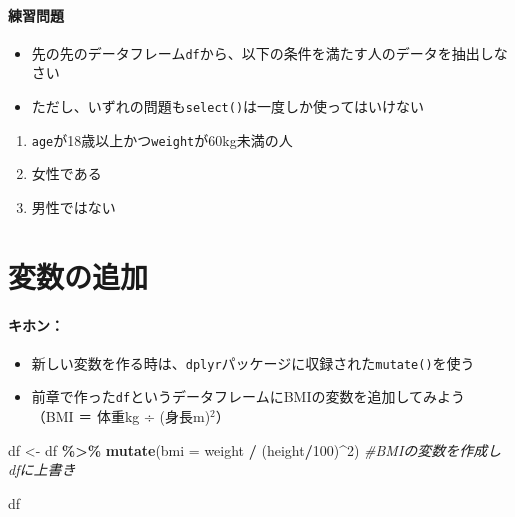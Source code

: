 \documentclass[
]{book}
\newenvironment{Shaded}{\begin{snugshade}}{\end{snugshade}}
\newcommand{\AttributeTok}[1]{\textcolor[rgb]{0.13,0.29,0.53}{#1}}
\newcommand{\CommentTok}[1]{\textcolor[rgb]{0.56,0.35,0.01}{\textit{#1}}}
\newcommand{\DecValTok}[1]{\textcolor[rgb]{0.00,0.00,0.81}{#1}}
\newcommand{\FunctionTok}[1]{\textcolor[rgb]{0.13,0.29,0.53}{\textbf{#1}}}
\newcommand{\NormalTok}[1]{#1}
\newcommand{\OtherTok}[1]{\textcolor[rgb]{0.56,0.35,0.01}{#1}}
\newcommand{\SpecialCharTok}[1]{\textcolor[rgb]{0.81,0.36,0.00}{\textbf{#1}}}
\providecommand{\tightlist}{%
  \setlength{\itemsep}{0pt}\setlength{\parskip}{0pt}}
\begin{document}
\hypertarget{ux7df4ux7fd2ux554fux984c-6}{%
\paragraph*{練習問題}\label{ux7df4ux7fd2ux554fux984c-6}}

\begin{itemize}
\tightlist
\item
  先の先のデータフレーム\texttt{df}から、以下の条件を満たす人のデータを抽出しなさい
\item
  ただし、いずれの問題も\texttt{select()}は一度しか使ってはいけない
\end{itemize}

\begin{enumerate}
\def\labelenumi{\arabic{enumi}.}
\tightlist
\item
  \texttt{age}が18歳以上かつ\texttt{weight}が60kg未満の人
\item
  女性である
\item
  男性ではない
\end{enumerate}

\hypertarget{ux5909ux6570ux306eux8ffdux52a0}{%
\section{変数の追加}\label{ux5909ux6570ux306eux8ffdux52a0}}

\hypertarget{ux30adux30dbux30f3}{%
\paragraph*{キホン：}\label{ux30adux30dbux30f3}}

\begin{itemize}
\tightlist
\item
  新しい変数を作る時は、\texttt{dplyr}パッケージに収録された\texttt{mutate()}を使う
\item
  前章で作った\texttt{df}というデータフレームにBMIの変数を追加してみよう\\
  （BMI ＝ 体重kg ÷ (身長m)\(^2\)）
\end{itemize}

\begin{Shaded}
\begin{Highlighting}[]
\NormalTok{df }\OtherTok{\textless{}{-}}\NormalTok{ df }\SpecialCharTok{\%\textgreater{}\%} 
  \FunctionTok{mutate}\NormalTok{(}\AttributeTok{bmi =}\NormalTok{ weight }\SpecialCharTok{/}\NormalTok{ (height}\SpecialCharTok{/}\DecValTok{100}\NormalTok{)}\SpecialCharTok{\^{}}\DecValTok{2}\NormalTok{) }\CommentTok{\#BMIの変数を作成しdfに上書き}

\NormalTok{df}
\end{Highlighting}
\end{Shaded}
\end{document}
